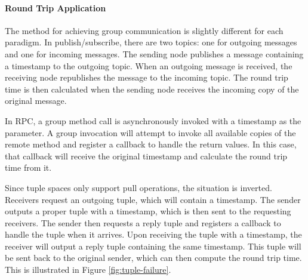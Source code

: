 \paragraph{Round Trip Application}\label{sec:rtapp}

The method for achieving group communication is slightly different for each paradigm. In publish/subscribe, there are two topics: one for outgoing messages and one for incoming messages. The sending node publishes a message containing a timestamp to the outgoing topic. When an outgoing message is received, the receiving node republishes the message to the incoming topic. The round trip time is then calculated when the sending node receives the incoming copy of the original message.

In RPC, a group method call is asynchronously invoked with a timestamp as the parameter. A group invocation will attempt to invoke all available copies of the remote method and register a callback to handle the return values. In this case, that callback will receive the original timestamp and calculate the round trip time from it.

Since tuple spaces only support pull operations, the situation is inverted. Receivers request an outgoing tuple, which will contain a timestamp. The sender outputs a proper tuple with a timestamp, which is then sent to the requesting receivers. The sender then requests a reply tuple and registers a callback to handle the tuple when it arrives. Upon receiving the tuple with a timestamp, the receiver will output a reply tuple containing the same timestamp. This tuple will be sent back to the original sender, which can then compute the round trip time. This is illustrated in Figure \ref{fig:tuple-failure}.


